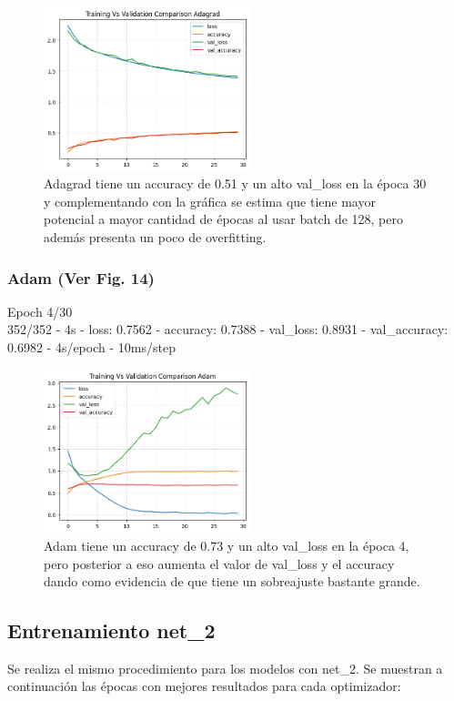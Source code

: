 \documentclass[journal]{IEEEtai}
\begin{document}
\begin{figure}[h!]
\centering
\includegraphics[width=6cm]{img/net1adagrad.png}
\caption{Adagrad tiene un accuracy de 0.51 y un alto val\_loss en la época 30 y complementando con la gráfica se estima que tiene mayor potencial a mayor cantidad de épocas al usar batch de 128, pero además presenta un poco de overfitting.}
\label{fig: net1adagrad}
\end{figure}

\subsubsection{\textbf{Adam} (Ver Fig. 14)} 
\hfill\break
Epoch 4/30\\
352/352 - 4s - loss: 0.7562 - accuracy: 0.7388 - val\_loss: 0.8931 - val\_accuracy: 0.6982 - 4s/epoch - 10ms/step

\begin{figure}[h!]
\centering
\includegraphics[width=6cm]{img/net1adam.png}
\caption{Adam tiene un accuracy de 0.73 y un alto val\_loss en la época 4, pero posterior a eso aumenta el valor de val\_loss y el accuracy dando como evidencia de que tiene un sobreajuste bastante grande.}
\label{fig: net1adam}
\end{figure}

\subsection{Entrenamiento net\_2}

Se realiza el mismo procedimiento para los modelos con net\_2. Se muestran a continuación las épocas con mejores resultados para cada optimizador:
\end{document}
